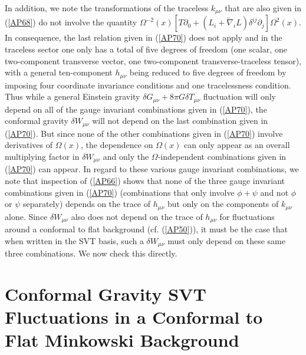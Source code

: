 \documentclass[aps]{revtex4}
\begin{document}
In addition, we note the transformations of the traceless $k_{\mu\nu}$ that are also given in (\ref{AP68}) do not involve the quantity $\Omega^{-2}(x)[T\partial_0+(L_i+\tilde{\nabla}_iL)\delta^{ij}\partial_j]\Omega^2(x)$. In consequence, the last relation given in (\ref{AP70}) does not apply and in the traceless sector one only has a total of five degrees of freedom (one scalar, one two-component transverse vector, one two-component transverse-traceless tensor), with a general ten-component $h_{\mu\nu}$ being reduced to five degrees of freedom by imposing four coordinate invariance conditions and one tracelessness condition. Thus while a general Einstein gravity $\delta G_{\mu\nu}+8\pi G \delta T_{\mu\nu}$ fluctuation will only depend on all of the gauge invariant combinations given in (\ref{AP70}), the conformal gravity $\delta W_{\mu\nu}$ will not depend on the last combination given in (\ref{AP70}). But since none of the other combinations given in (\ref{AP70}) involve derivatives of $\Omega(x)$,  the dependence on $\Omega(x)$ can only appear as an overall multiplying factor in $\delta W_{\mu\nu}$ and only the $\Omega$-independent combinations given in (\ref{AP70}) can appear. In regard to these various gauge invariant combinations, we note that inspection of (\ref{AP66}) shows that none of the three gauge invariant combinations given in (\ref{AP70}) (combinations that only involve $\phi+\psi$ and not $\phi$ or $\psi$ separately) depends on the trace of $h_{\mu\nu}$ but only on the components of $k_{\mu\nu}$ alone. Since $\delta W_{\mu\nu}$ also does not depend on the trace of $h_{\mu\nu}$ for fluctuations around a conformal to  flat background (cf. (\ref{AP50})), it must be the case that when written in the SVT basis,  such a $\delta W_{\mu\nu}$ must only depend on these same three combinations. We now check this directly.


\section{Conformal Gravity SVT Fluctuations in a Conformal to Flat Minkowski Background}
\label{S6}
\end{document}
